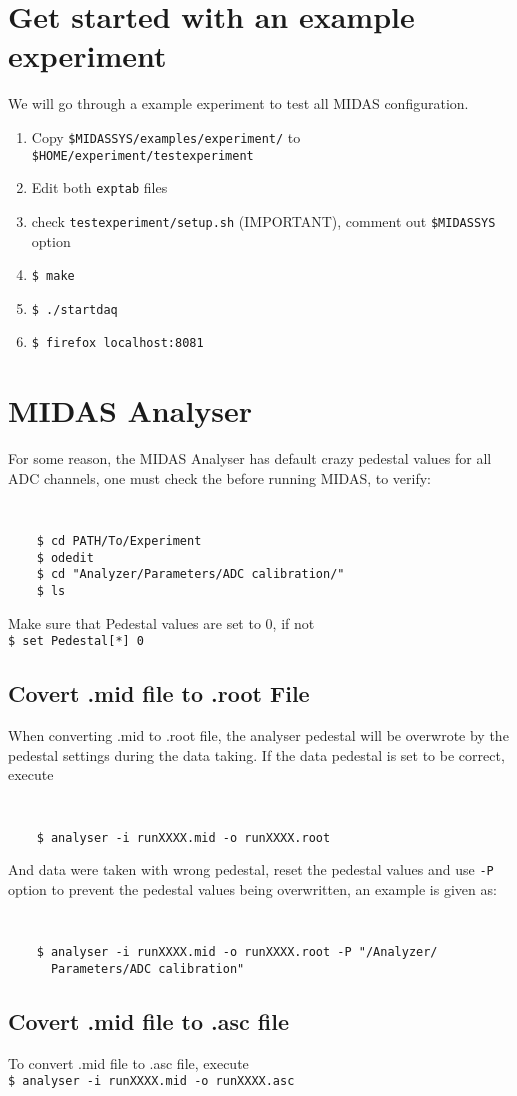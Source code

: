 \documentclass[12pt, letterpaper]{article}
\newcommand{\longindent}{\hangindent=1.01cm}
\begin{document}
\section{Get started with an example experiment}
We will go through a example experiment to test all MIDAS configuration. 

\begin{enumerate}
\item Copy {\tt \$MIDASSYS/examples/experiment/} to \\ {\tt \$HOME/experiment/testexperiment}
\item Edit both {\tt exptab} files
\item check {\tt testexperiment/setup.sh} (IMPORTANT), comment out \texttt{\$MIDASSYS} option
\item {\tt \$ make}
\item {\tt \$ ./startdaq}
\item {\tt \$ firefox localhost:8081}
\end{enumerate}




\section{MIDAS Analyser} 
For some reason, the MIDAS Analyser has default crazy pedestal values for all ADC channels, one must check the before running MIDAS, to verify:
{\tt 
\begin{lstlisting}
    $ cd PATH/To/Experiment
    $ odedit
    $ cd "Analyzer/Parameters/ADC calibration/"
    $ ls
\end{lstlisting}
}
Make sure that Pedestal values are set to 0, if not\\ 
\longindent \texttt{\$ set Pedestal[*] 0}


\subsection{Covert .mid file to .root File}  
When converting .mid to .root file, the analyser pedestal will be overwrote by the pedestal settings during the data taking. If the data pedestal is set to be correct, execute
{\tt
\begin{lstlisting}
    $ analyser -i runXXXX.mid -o runXXXX.root
\end{lstlisting}}

And data were taken with wrong pedestal, reset the pedestal values and use \texttt{-P} option to prevent the pedestal values being overwritten, an example is given as: 
{\tt
\begin{lstlisting}
    $ analyser -i runXXXX.mid -o runXXXX.root -P "/Analyzer/
      Parameters/ADC calibration" 
\end{lstlisting}}


\subsection{Covert .mid file to .asc file}  

To convert .mid file to .asc file, execute\\ 
\longindent \texttt{\$ analyser -i runXXXX.mid -o runXXXX.asc}
\end{document}
